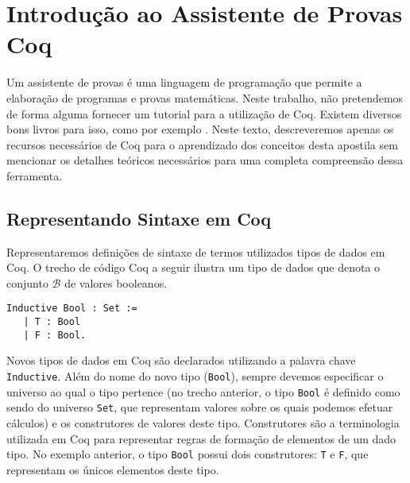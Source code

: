 \section{Introdu\c{c}\~ao ao Assistente de Provas Coq}\label{cap1:coq}

Um assistente de provas \'e uma linguagem de programa\c{c}\~ao que permite a elabora\c{c}\~ao de programas e provas matem\'aticas.
Neste trabalho, n\~ao pretendemos de forma alguma fornecer um tutorial para a utiliza\c{c}\~ao de Coq. Existem diversos bons livros
para isso, como por exemplo \cite{coqart,Pierce12,Coqrefman}. Neste texto, descreveremos apenas os recursos necess\'arios de Coq para
o aprendizado dos conceitos desta apostila sem mencionar os detalhes te\'oricos necess\'arios para uma completa compreens\~ao dessa ferramenta.

\subsection{Representando Sintaxe em Coq}

Representaremos defini\c{c}\~oes de sintaxe de termos utilizados tipos de dados em Coq. O trecho de c\'odigo Coq a seguir ilustra um
tipo de dados que denota o conjunto $\mathcal{B}$ de valores booleanos.

\begin{lstlisting}
Inductive Bool : Set :=
   | T : Bool
   | F : Bool.
\end{lstlisting}

Novos tipos de dados em Coq s\~ao declarados utilizando a palavra chave \texttt{Inductive}. Al\'em do nome do novo tipo (\texttt{Bool}), sempre
devemos especificar o universo ao qual o tipo pertence (no trecho anterior, o tipo \texttt{Bool} \'e definido como sendo do universo 
\texttt{Set}, que representam valores sobre os quais podemos efetuar c\'alculos) e os construtores de valores deste tipo. Construtores s\~ao
a terminologia utilizada em Coq para representar regras de forma\c{c}\~ao de elementos de um dado tipo. No exemplo anterior, o tipo \texttt{Bool}
possui dois construtores: \texttt{T} e \texttt{F}, que representam os \'unicos elementos deste tipo.

